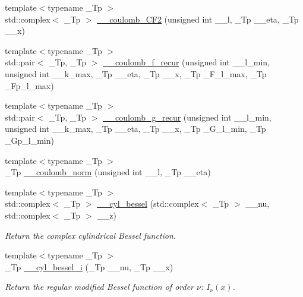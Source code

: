 \begin{DoxyCompactItemize}
\item 
{\footnotesize template$<$typename \+\_\+\+Tp $>$ }\\std\+::complex$<$ \+\_\+\+Tp $>$ \hyperlink{namespacestd_1_1____detail_a400332397b6d529764b61bdd7726f75c}{\+\_\+\+\_\+coulomb\+\_\+\+C\+F2} (unsigned int \+\_\+\+\_\+l, \+\_\+\+Tp \+\_\+\+\_\+eta, \+\_\+\+Tp \+\_\+\+\_\+x)
\item 
{\footnotesize template$<$typename \+\_\+\+Tp $>$ }\\std\+::pair$<$ \+\_\+\+Tp, \+\_\+\+Tp $>$ \hyperlink{namespacestd_1_1____detail_ab6a730206fba9db024f3c1c26fe6a954}{\+\_\+\+\_\+coulomb\+\_\+f\+\_\+recur} (unsigned int \+\_\+\+\_\+l\+\_\+min, unsigned int \+\_\+\+\_\+k\+\_\+max, \+\_\+\+Tp \+\_\+\+\_\+eta, \+\_\+\+Tp \+\_\+\+\_\+x, \+\_\+\+Tp \+\_\+\+F\+\_\+l\+\_\+max, \+\_\+\+Tp \+\_\+\+Fp\+\_\+l\+\_\+max)
\item 
{\footnotesize template$<$typename \+\_\+\+Tp $>$ }\\std\+::pair$<$ \+\_\+\+Tp, \+\_\+\+Tp $>$ \hyperlink{namespacestd_1_1____detail_ad3bcd9e0587db5699088065900382e8b}{\+\_\+\+\_\+coulomb\+\_\+g\+\_\+recur} (unsigned int \+\_\+\+\_\+l\+\_\+min, unsigned int \+\_\+\+\_\+k\+\_\+max, \+\_\+\+Tp \+\_\+\+\_\+eta, \+\_\+\+Tp \+\_\+\+\_\+x, \+\_\+\+Tp \+\_\+\+G\+\_\+l\+\_\+min, \+\_\+\+Tp \+\_\+\+Gp\+\_\+l\+\_\+min)
\item 
{\footnotesize template$<$typename \+\_\+\+Tp $>$ }\\\+\_\+\+Tp \hyperlink{namespacestd_1_1____detail_a568c1e2b831de815e9ffb1b9c9fe1170}{\+\_\+\+\_\+coulomb\+\_\+norm} (unsigned int \+\_\+\+\_\+l, \+\_\+\+Tp \+\_\+\+\_\+eta)
\item 
{\footnotesize template$<$typename \+\_\+\+Tp $>$ }\\std\+::complex$<$ \+\_\+\+Tp $>$ \hyperlink{namespacestd_1_1____detail_ac4cff6a34fbd90932b47ecdb2445dee2}{\+\_\+\+\_\+cyl\+\_\+bessel} (std\+::complex$<$ \+\_\+\+Tp $>$ \+\_\+\+\_\+nu, std\+::complex$<$ \+\_\+\+Tp $>$ \+\_\+\+\_\+z)
\begin{DoxyCompactList}\small\item\em Return the complex cylindrical Bessel function. \end{DoxyCompactList}\item 
{\footnotesize template$<$typename \+\_\+\+Tp $>$ }\\\+\_\+\+Tp \hyperlink{namespacestd_1_1____detail_a72e3392d5c03c0bc8f2b5ffb8c1304b5}{\+\_\+\+\_\+cyl\+\_\+bessel\+\_\+i} (\+\_\+\+Tp \+\_\+\+\_\+nu, \+\_\+\+Tp \+\_\+\+\_\+x)
\begin{DoxyCompactList}\small\item\em Return the regular modified Bessel function of order $ \nu $\+: $ I_{\nu}(x) $. \end{DoxyCompactList}\item 

\end{DoxyCompactItemize}
